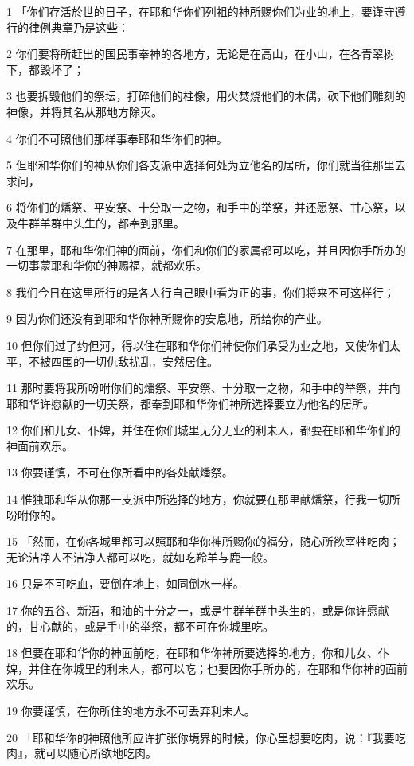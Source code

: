 \par 1 「你们存活於世的日子，在耶和华你们列祖的神所赐你们为业的地上，要谨守遵行的律例典章乃是这些：
\par 2 你们要将所赶出的国民事奉神的各地方，无论是在高山，在小山，在各青翠树下，都毁坏了；
\par 3 也要拆毁他们的祭坛，打碎他们的柱像，用火焚烧他们的木偶，砍下他们雕刻的神像，并将其名从那地方除灭。
\par 4 你们不可照他们那样事奉耶和华你们的神。
\par 5 但耶和华你们的神从你们各支派中选择何处为立他名的居所，你们就当往那里去求问，
\par 6 将你们的燔祭、平安祭、十分取一之物，和手中的举祭，并还愿祭、甘心祭，以及牛群羊群中头生的，都奉到那里。
\par 7 在那里，耶和华你们神的面前，你们和你们的家属都可以吃，并且因你手所办的一切事蒙耶和华你的神赐福，就都欢乐。
\par 8 我们今日在这里所行的是各人行自己眼中看为正的事，你们将来不可这样行；
\par 9 因为你们还没有到耶和华你神所赐你的安息地，所给你的产业。
\par 10 但你们过了约但河，得以住在耶和华你们神使你们承受为业之地，又使你们太平，不被四围的一切仇敌扰乱，安然居住。
\par 11 那时要将我所吩咐你们的燔祭、平安祭、十分取一之物，和手中的举祭，并向耶和华许愿献的一切美祭，都奉到耶和华你们神所选择要立为他名的居所。
\par 12 你们和儿女、仆婢，并住在你们城里无分无业的利未人，都要在耶和华你们的神面前欢乐。
\par 13 你要谨慎，不可在你所看中的各处献燔祭。
\par 14 惟独耶和华从你那一支派中所选择的地方，你就要在那里献燔祭，行我一切所吩咐你的。
\par 15 「然而，在你各城里都可以照耶和华你神所赐你的福分，随心所欲宰牲吃肉；无论洁净人不洁净人都可以吃，就如吃羚羊与鹿一般。
\par 16 只是不可吃血，要倒在地上，如同倒水一样。
\par 17 你的五谷、新酒，和油的十分之一，或是牛群羊群中头生的，或是你许愿献的，甘心献的，或是手中的举祭，都不可在你城里吃。
\par 18 但要在耶和华你的神面前吃，在耶和华你神所要选择的地方，你和儿女、仆婢，并住在你城里的利未人，都可以吃；也要因你手所办的，在耶和华你神的面前欢乐。
\par 19 你要谨慎，在你所住的地方永不可丢弃利未人。
\par 20 「耶和华你的神照他所应许扩张你境界的时候，你心里想要吃肉，说：『我要吃肉』，就可以随心所欲地吃肉。
